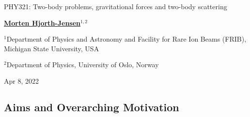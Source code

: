 \documentclass[%
oneside,                 %
final,                   %
10pt]{article}
\begin{document}

\newcommand{\exercisesection}[1]{\subsection*{#1}}






\thispagestyle{empty}

\begin{center}
{\LARGE\bf
\begin{spacing}{1.25}
PHY321: Two-body problems, gravitational forces and two-body scattering 
\end{spacing}
}
\end{center}


\begin{center}
{\bf \href{{http://mhjgit.github.io/info/doc/web/}}{Morten Hjorth-Jensen}${}^{1, 2}$} \\ [0mm]
\end{center}

\begin{center}
\centerline{{\small ${}^1$Department of Physics and Astronomy and Facility for Rare Ion Beams (FRIB), Michigan State University, USA}}
\centerline{{\small ${}^2$Department of Physics, University of Oslo, Norway}}
\end{center}
    

\begin{center}
Apr 8, 2022
\end{center}

\vspace{1cm}


\subsection*{Aims and Overarching Motivation}
\end{document}
